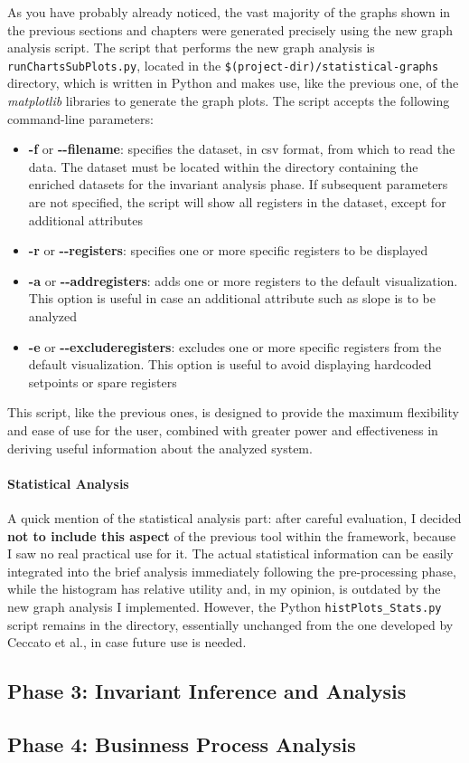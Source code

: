 \bigskip
As you have probably already noticed, the vast majority of the graphs shown in the previous sections and chapters were generated precisely using the new graph analysis script.\newline
The script that performs the new graph analysis is \texttt{runChartsSubPlots.py}, located in the \texttt{\$(project-dir)/statistical-graphs} directory, which is written in Python and makes use, like the previous one, of the \textit{matplotlib} libraries to generate the graph plots.\newline
The script accepts the following command-line parameters:

\begin{itemize}
	\item \textbf{-f} or \textbf{{-}{-}filename}: specifies the dataset, in csv format, from which to read the data. The dataset must be located within the directory containing the enriched datasets for the invariant analysis phase. If subsequent parameters are not specified, the script will show all registers in the dataset, except for additional attributes
	
	\item \textbf{-r} or \textbf{{-}{-}registers}: specifies one or more specific registers to be displayed
	
	\item \textbf{-a} or \textbf{{-}{-}addregisters}: adds one or more registers to the default visualization. This option is useful in case an additional attribute such as slope is to be analyzed
	
	\item \textbf{-e} or \textbf{{-}{-}excluderegisters}: excludes one or more specific registers from the default visualization. This option is useful to avoid displaying hardcoded setpoints or spare registers
\end{itemize}
This script, like the previous ones, is designed to provide the maximum flexibility and ease of use for the user, combined with greater power and effectiveness in deriving useful information about the analyzed system.

\paragraph{Statistical Analysis} A quick mention of the statistical analysis part: after careful evaluation, I decided \textbf{not to include this aspect} of the previous tool within the framework, because I saw no real practical use for it. The actual statistical information can be easily integrated into the brief analysis immediately following the pre-processing phase, while the histogram has relative utility and, in my opinion, is outdated by the new graph analysis I implemented. \newline
However, the Python \texttt{histPlots\_Stats.py} script remains in the directory, essentially unchanged from the one developed by Ceccato et al., in case future use is needed. 

\subsection{Phase 3: Invariant Inference and Analysis}
\label{subsec:improve_invariants}


\subsection{Phase 4: Businness Process Analysis}
\label{subsec:improve_bpa}

\vfill
\nolinenumbers